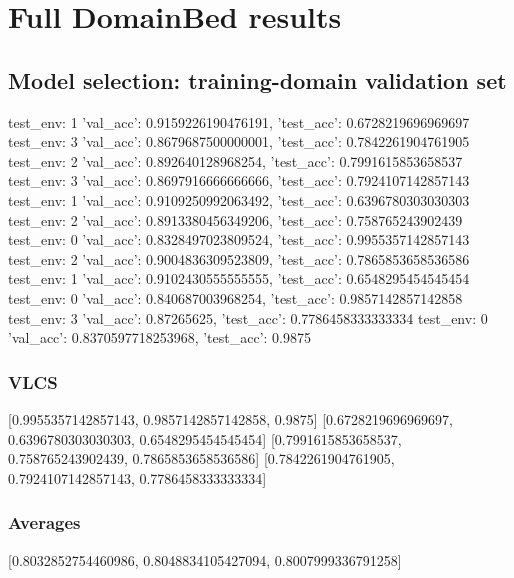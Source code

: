 \documentclass{article}
\begin{document}
\section{Full DomainBed results}

\subsection{Model selection: training-domain validation set}
test_env: 1
{'val_acc': 0.9159226190476191, 'test_acc': 0.6728219696969697}
test_env: 3
{'val_acc': 0.8679687500000001, 'test_acc': 0.7842261904761905}
test_env: 2
{'val_acc': 0.892640128968254, 'test_acc': 0.7991615853658537}
test_env: 3
{'val_acc': 0.8697916666666666, 'test_acc': 0.7924107142857143}
test_env: 1
{'val_acc': 0.9109250992063492, 'test_acc': 0.6396780303030303}
test_env: 2
{'val_acc': 0.8913380456349206, 'test_acc': 0.758765243902439}
test_env: 0
{'val_acc': 0.8328497023809524, 'test_acc': 0.9955357142857143}
test_env: 2
{'val_acc': 0.9004836309523809, 'test_acc': 0.7865853658536586}
test_env: 1
{'val_acc': 0.9102430555555555, 'test_acc': 0.6548295454545454}
test_env: 0
{'val_acc': 0.840687003968254, 'test_acc': 0.9857142857142858}
test_env: 3
{'val_acc': 0.87265625, 'test_acc': 0.7786458333333334}
test_env: 0
{'val_acc': 0.8370597718253968, 'test_acc': 0.9875}

\subsubsection{VLCS}
[0.9955357142857143, 0.9857142857142858, 0.9875]
[0.6728219696969697, 0.6396780303030303, 0.6548295454545454]
[0.7991615853658537, 0.758765243902439, 0.7865853658536586]
[0.7842261904761905, 0.7924107142857143, 0.7786458333333334]

\begin{center}
\end{center}

\subsubsection{Averages}
[0.8032852754460986, 0.8048834105427094, 0.8007999336791258]

\begin{center}
\end{center}
\end{document}

